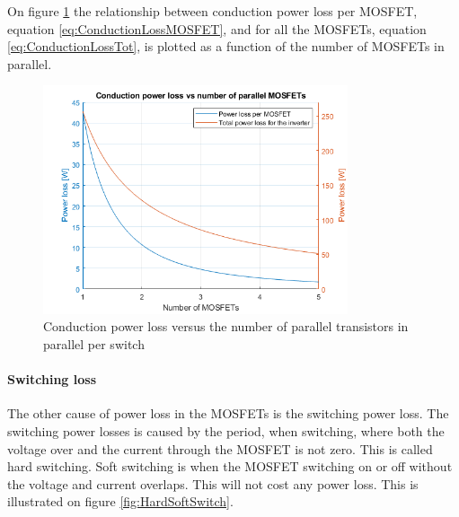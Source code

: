 On figure \ref{fig:ConductionLoss} the relationship between conduction power loss per MOSFET, equation \ref{eq:ConductionLossMOSFET}, and for all the MOSFETs, equation \ref{eq:ConductionLossTot}, is plotted as a function of the number of MOSFETs in parallel. 

    \begin{figure}[H]
		\centering
		\includegraphics[width=0.8\textwidth]{pictures/hardware/Power_Board/Conduction_loss.png}
		\caption{Conduction power loss versus the number of parallel transistors in parallel per switch}
		\label{fig:ConductionLoss}
	\end{figure} 

\paragraph{Switching loss}
The other cause of power loss in the MOSFETs is the switching power loss. The switching power losses is caused by the period, when switching, where both the voltage over and the current through the MOSFET is not zero. This is called hard switching. Soft switching is when the MOSFET switching on or off without the voltage and current overlaps. This will not cost any power loss. This is illustrated on figure \ref{fig:HardSoftSwitch}.

